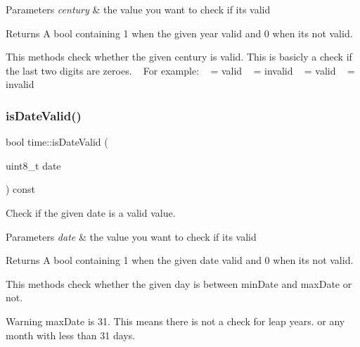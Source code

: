 \begin{DoxyParams}{Parameters}
{\em century} & the value you want to check if it\textquotesingle{}s valid \\
\hline
\end{DoxyParams}
\begin{DoxyReturn}{Returns}
A bool containing 1 when the given year valid and 0 when it\textquotesingle{}s not valid.
\end{DoxyReturn}
This methods check whether the given century is valid. This is basicly a check if the last two digits are zeroes. ~\newline
 For example\+: ~ = valid ~ = invalid ~ = valid ~ = invalid ~\newline
 \mbox{\label{classtime_aa678e8f53a12adda2f807e6a44ebc46d}} 
\subsubsection{\texorpdfstring{is\+Date\+Valid()}{isDateValid()}}
{\footnotesize\ttfamily bool time\+::is\+Date\+Valid (\begin{DoxyParamCaption}\item[{uint8\+\_\+t}]{date }\end{DoxyParamCaption}) const}



Check if the given date is a valid value. 


\begin{DoxyParams}{Parameters}
{\em date} & the value you want to check if it\textquotesingle{}s valid \\
\hline
\end{DoxyParams}
\begin{DoxyReturn}{Returns}
A bool containing 1 when the given date valid and 0 when it\textquotesingle{}s not valid.
\end{DoxyReturn}
This methods check whether the given day is between min\+Date and max\+Date or not. \begin{DoxyWarning}{Warning}
max\+Date is 31. This means there is not a check for leap years. or any month with less than 31 days. 
\end{DoxyWarning}
\mbox{\label{classtime_a126cf22d6b3a7a36603e2cb390082d2f}} 
